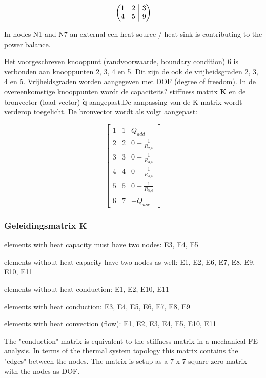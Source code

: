 \[
\left(\hspace{-5pt}\begin{array}{cc|c}
	1 & 2 & 3 \\
	4 & 5 & 9
\end{array}\hspace{-5pt}\right)
\]

In nodes N1 and N7 an external een heat source / heat sink is contributing to the power balance.

Het voorgeschreven knooppunt (randvoorwaarde, boundary condition) 6 is verbonden aan knooppunten 2, 3, 4 en 5. Dit zijn de ook de vrijheidsgraden 2, 3, 4 en 5. Vrijheidsgraden worden aangegeven met DOF (degree of freedom). In de overeenkomstige knooppunten wordt de capaciteits? stiffness matrix $\mathbf{K}$ en de bronvector (load vector) $\mathbf{\dot{q}}$ aangepast.De aanpassing van de K-matrix wordt verderop toegelicht. De bronvector wordt als volgt aangepast:

\[
\begin{bmatrix}
	1 & 1 & \dot{Q}_{add} \\
	2 & 2 & 0 - \frac{1}{R_{2,6}} \\
	3 & 3 & 0 - \frac{1}{R_{3,6}} \\
	4 & 4 & 0 - \frac{1}{R_{4,6}} \\
	5 & 5 & 0 - \frac{1}{R_{5,6}} \\
	6 & 7 & -\dot{Q}_{use}
\end{bmatrix}
\]


\subsubsection{Geleidingsmatrix $\mathbf{K}$}

elements with heat capacity must have two nodes:
E3, E4, E5

elements without heat capacity have two nodes as well:
E1, E2, E6, E7, E8, E9, E10, E11

elements without heat conduction:
E1, E2, E10, E11

elements with heat conduction:
E3, E4, E5, E6, E7, E8, E9

elements with heat convection (flow):
E1, E2, E3, E4, E5, E10, E11

The "conduction" matrix is equivalent to the stiffness matrix in a mechanical FE analysis.
In terms of the thermal system topology this matrix contains the "edges" between the nodes. The matrix is setup as a 7 x 7 square zero matrix with the nodes as DOF.

